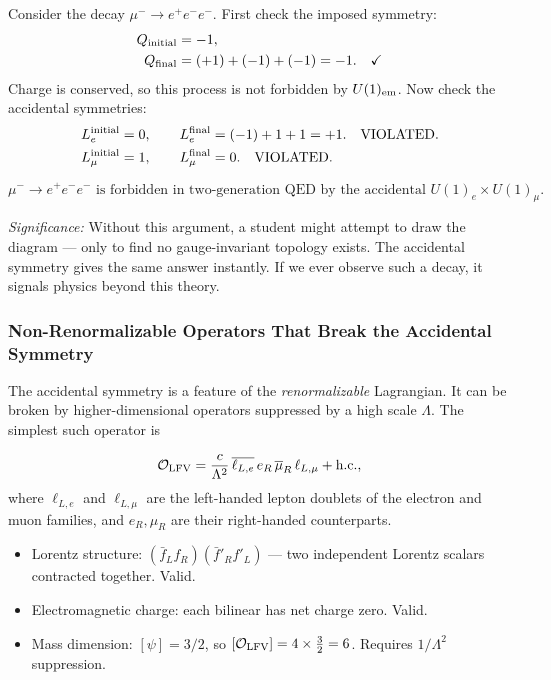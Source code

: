 \documentclass[../main.tex]{subfiles}
\begin{document}
Consider the decay $\mu^- \to e^+e^-e^-$.  First check the imposed symmetry:
\begin{align*}
  Q_{\rm initial} &= -1, \\
  Q_{\rm final}   &= (+1) + (-1) + (-1) = -1. \quad\checkmark
\end{align*}
Charge is conserved, so this process is not forbidden by $U(1)_{\rm em}$.  Now check the accidental symmetries:
\begin{align*}
  L_e^{\rm initial} &= 0, \qquad L_e^{\rm final} = (-1) + 1 + 1 = +1. \quad \text{VIOLATED.}\\
  L_\mu^{\rm initial} &= 1, \qquad L_\mu^{\rm final} = 0. \quad \text{VIOLATED.}
\end{align*}

\begin{equation}
  \boxed{
  \mu^-\to e^+e^-e^- \text{ is forbidden in two-generation QED by the accidental }
  U(1)_e\times U(1)_\mu.}
  \label{eq:lec12:forbidden}
\end{equation}

\textit{Significance:} Without this argument, a student might attempt to draw the diagram — only to find no gauge-invariant topology exists.  The accidental symmetry gives the same answer instantly.  If we ever observe such a decay, it signals physics beyond this theory.

\subsubsection*{Non-Renormalizable Operators That Break the Accidental Symmetry}

The accidental symmetry is a feature of the \emph{renormalizable} Lagrangian.  It can be broken by higher-dimensional operators suppressed by a high scale $\Lambda$.  The simplest such operator is

\begin{equation}
  \mathcal{O}_{\rm LFV}
  = \frac{c}{\Lambda^2}\,\overline{\ell_{L,e}}\,e_R\,\overline{\mu}_R\,\ell_{L,\mu}
  + \text{h.c.},
  \label{eq:lec12:nonren}
\end{equation}
where $\ell_{L,e}$ and $\ell_{L,\mu}$ are the left-handed lepton doublets of the electron and muon families, and $e_R, \mu_R$ are their right-handed counterparts.

\begin{itemize}
  \item Lorentz structure: $(\bar{f}_L f_R)(\bar{f}'_R f'_L)$ — two independent Lorentz scalars contracted together.  Valid.
  \item Electromagnetic charge: each bilinear has net charge zero.  Valid.
  \item Mass dimension: $[\psi] = 3/2$, so $[\mathcal{O}_{\rm LFV}] = 4 \times \tfrac{3}{2} = 6$.  Requires $1/\Lambda^2$ suppression.
\end{itemize}
\end{document}
